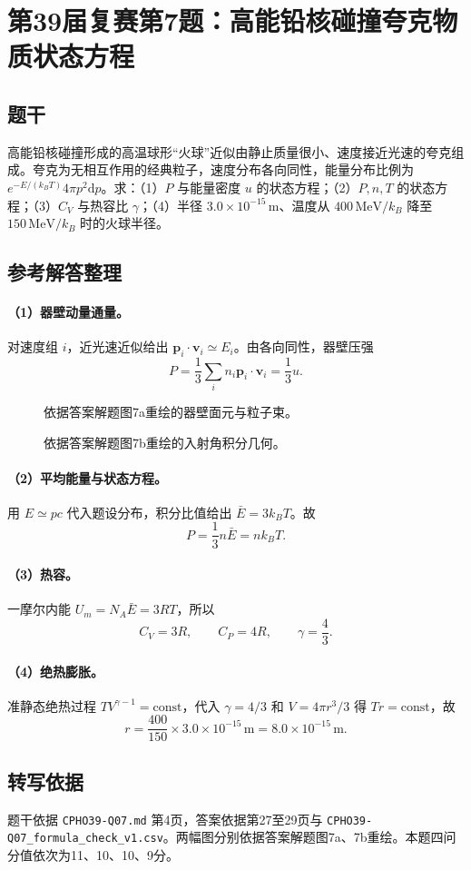 \section{第39届复赛第7题：高能铅核碰撞夸克物质状态方程}
\subsection{题干}
高能铅核碰撞形成的高温球形“火球”近似由静止质量很小、速度接近光速的夸克组成。夸克为无相互作用的经典粒子，速度分布各向同性，能量分布比例为 $e^{-E/(k_BT)}4\pi p^2\mathrm dp$。求：（1）$P$ 与能量密度 $u$ 的状态方程；（2）$P,n,T$ 的状态方程；（3）$C_V$ 与热容比 $\gamma$；（4）半径 $3.0\times10^{-15}\,\mathrm m$、温度从 $400\,\mathrm{MeV}/k_B$ 降至 $150\,\mathrm{MeV}/k_B$ 时的火球半径。
\subsection{参考解答整理}
\paragraph{（1）器壁动量通量。} 对速度组 $i$，近光速近似给出 $\boldsymbol p_i\cdot\boldsymbol v_i\simeq E_i$。由各向同性，器壁压强
\[P=\frac13\sum_i n_i\boldsymbol p_i\cdot\boldsymbol v_i=\boxed{\frac13u}.\]
\begin{figure}[htbp]\centering\caption{依据答案解题图7a重绘的器壁面元与粒子束。}\end{figure}
\begin{figure}[htbp]\centering\caption{依据答案解题图7b重绘的入射角积分几何。}\end{figure}
\paragraph{（2）平均能量与状态方程。} 用 $E\simeq pc$ 代入题设分布，积分比值给出 $\bar E=3k_BT$。故
\[\boxed{P=\frac13n\bar E=nk_BT}.\]
\paragraph{（3）热容。} 一摩尔内能 $U_m=N_A\bar E=3RT$，所以
\[\boxed{C_V=3R,\qquad C_P=4R,\qquad \gamma=\frac43}.\]
\paragraph{（4）绝热膨胀。} 准静态绝热过程 $TV^{\gamma-1}=\mathrm{const}$，代入 $\gamma=4/3$ 和 $V=4\pi r^3/3$ 得 $Tr=\mathrm{const}$，故
\[\boxed{r=\frac{400}{150}\times3.0\times10^{-15}\,\mathrm m=8.0\times10^{-15}\,\mathrm m}.\]
\subsection{转写依据}
题干依据 \texttt{CPHO39-Q07.md} 第4页，答案依据第27至29页与 \texttt{CPHO39-Q07\_formula\_check\_v1.csv}。两幅图分别依据答案解题图7a、7b重绘。本题四问分值依次为11、10、10、9分。
